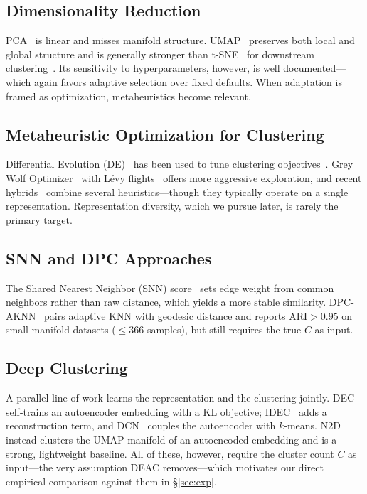 \documentclass[conference]{IEEEtran}
\begin{document}
\subsection{Dimensionality Reduction}
PCA~\cite{jolliffe2002principal} is linear and misses manifold structure. UMAP~\cite{mcinnes2018umap} preserves both local and global structure and is generally stronger than t-SNE~\cite{van2008visualizing} for downstream clustering~\cite{becht2019dimensionality}. Its sensitivity to hyperparameters, however, is well documented---which again favors adaptive selection over fixed defaults. When adaptation is framed as optimization, metaheuristics become relevant.

\subsection{Metaheuristic Optimization for Clustering}
Differential Evolution (DE)~\cite{storn1997differential} has been used to tune clustering objectives~\cite{das2008automatic}. Grey Wolf Optimizer~\cite{mirjalili2014grey} with L\'{e}vy flights~\cite{yang2010nature} offers more aggressive exploration, and recent hybrids~\cite{faris2018grey} combine several heuristics---though they typically operate on a single representation. Representation diversity, which we pursue later, is rarely the primary target.

\subsection{SNN and DPC Approaches}
The Shared Nearest Neighbor (SNN) score~\cite{ertoz2003finding} sets edge weight from common neighbors rather than raw distance, which yields a more stable similarity. DPC-AKNN~\cite{wang2026density} pairs adaptive KNN with geodesic distance and reports ARI${>}0.95$ on small manifold datasets (${\leq}366$ samples), but still requires the true $C$ as input.

\subsection{Deep Clustering}
A parallel line of work learns the representation and the clustering jointly. DEC~\cite{xie2016unsupervised} self-trains an autoencoder embedding with a KL objective; IDEC~\cite{guo2017improved} adds a reconstruction term, and DCN~\cite{yang2017towards} couples the autoencoder with $k$-means. N2D~\cite{mcconville2021n2d} instead clusters the UMAP manifold of an autoencoded embedding and is a strong, lightweight baseline. All of these, however, require the cluster count $C$ as input---the very assumption DEAC removes---which motivates our direct empirical comparison against them in \S\ref{sec:exp}.
\end{document}
